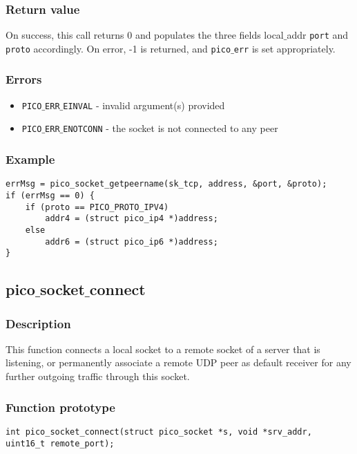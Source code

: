 \subsubsection*{Return value}
On success, this call returns 0 and populates the three fields {local$\_$addr} \texttt{port} and \texttt{proto} accordingly.
On error, -1 is returned, and \texttt{pico$\_$err} is set appropriately.

\subsubsection*{Errors}
\begin{itemize}[noitemsep]
\item \texttt{PICO$\_$ERR$\_$EINVAL} - invalid argument(s) provided
\item \texttt{PICO$\_$ERR$\_$ENOTCONN} - the socket is not connected to any peer
\end{itemize}

\subsubsection*{Example}
\begin{verbatim}
errMsg = pico_socket_getpeername(sk_tcp, address, &port, &proto);
if (errMsg == 0) {
    if (proto == PICO_PROTO_IPV4)
        addr4 = (struct pico_ip4 *)address;
    else
        addr6 = (struct pico_ip6 *)address;
}
\end{verbatim}


\subsection{pico$\_$socket$\_$connect}

\subsubsection*{Description}
This function connects a local socket to a remote socket of a server that is listening, or permanently associate a remote UDP peer as default receiver for any further outgoing traffic through this socket.

\subsubsection*{Function prototype}
\begin{verbatim}
int pico_socket_connect(struct pico_socket *s, void *srv_addr,
uint16_t remote_port);
\end{verbatim}


